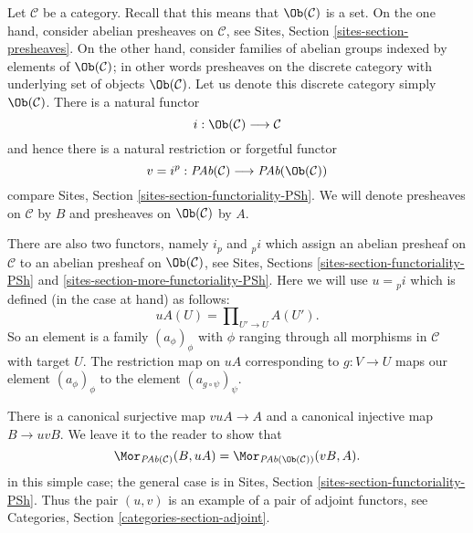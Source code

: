 \noindent
Let $\mathcal{C}$ be a category. Recall that this means that
$\Ob(\mathcal{C})$ is a set. On the one hand, consider abelian
presheaves on $\mathcal{C}$, see
Sites, Section \ref{sites-section-presheaves}.
On the other hand, consider families of abelian groups
indexed by elements of $\Ob(\mathcal{C})$; in other
words presheaves on the discrete category with underlying set
of objects $\Ob(\mathcal{C})$. Let us denote this
discrete category simply $\Ob(\mathcal{C})$.
There is a natural functor
$$
i : \Ob(\mathcal{C}) \longrightarrow \mathcal{C}
$$
and hence there is a natural restriction or forgetful functor
$$
v = i^p :
\textit{PAb}(\mathcal{C})
\longrightarrow
\textit{PAb}(\Ob(\mathcal{C}))
$$
compare Sites, Section \ref{sites-section-functoriality-PSh}.
We will denote presheaves
on $\mathcal{C}$ by $B$ and presheaves on
$\Ob(\mathcal{C})$ by $A$.

\medskip\noindent
There are also two functors, namely $i_p$ and ${}_pi$
which assign an abelian presheaf on $\mathcal{C}$
to an abelian presheaf on $\Ob(\mathcal{C})$, see
Sites, Sections \ref{sites-section-functoriality-PSh} and
\ref{sites-section-more-functoriality-PSh}.
Here we will use $u = {}_pi$ which is defined (in the case at hand)
as follows:
$$
uA(U) = \prod\nolimits_{U' \to U} A(U').
$$
So an element is a family $(a_\phi)_\phi$ with $\phi$
ranging through all morphisms in $\mathcal{C}$ with target $U$.
The restriction map on $uA$ corresponding to $g : V \to U$
maps our element $(a_\phi)_\phi$ to the element
$(a_{g \circ \psi})_\psi$.

\medskip\noindent
There is a canonical surjective map $vuA \to A$ and a canonical
injective map $B \to uvB$. We leave it to the reader to show that
$$
\Mor_{\textit{PAb}(\mathcal{C})}(B, uA)
=
\Mor_{\textit{PAb}(\Ob(\mathcal{C}))}(vB, A).
$$
in this simple case; the general case is in
Sites, Section \ref{sites-section-functoriality-PSh}.
Thus the pair $(u, v)$ is an example of a pair of adjoint
functors, see
Categories, Section \ref{categories-section-adjoint}.

